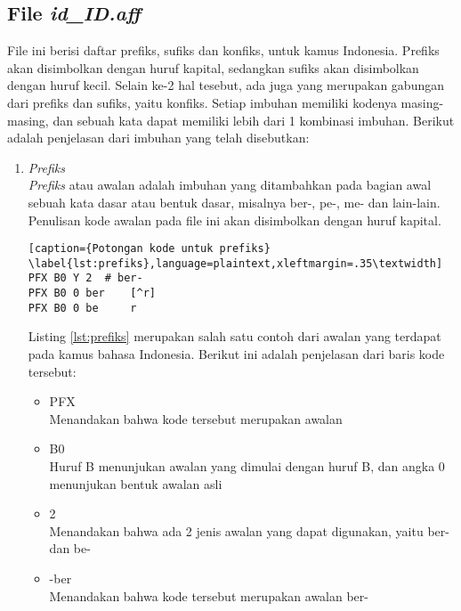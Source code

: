 \subsection{File \textit{id\_ID.aff}}

File ini berisi daftar prefiks, sufiks dan konfiks, untuk kamus Indonesia. Prefiks akan disimbolkan dengan huruf kapital, sedangkan sufiks akan disimbolkan dengan huruf kecil. Selain ke-2 hal tesebut, ada juga yang merupakan gabungan dari prefiks dan sufiks, yaitu konfiks. Setiap imbuhan memiliki kodenya masing-masing, dan sebuah kata dapat memiliki lebih dari 1 kombinasi imbuhan. Berikut adalah penjelasan dari imbuhan yang telah disebutkan:

\begin{enumerate}
	\item \textit{Prefiks} \\
	\textit{Prefiks} atau awalan adalah imbuhan yang ditambahkan pada bagian awal sebuah kata dasar atau bentuk dasar, misalnya ber-, pe-, me- dan lain-lain. Penulisan kode awalan pada file ini akan disimbolkan dengan huruf kapital.
	
	\begin{lstlisting}[caption={Potongan kode untuk prefiks}			\label{lst:prefiks},language=plaintext,xleftmargin=.35\textwidth] 
PFX B0 Y 2	# ber-
PFX B0 0 ber  	[^r]
PFX B0 0 be    	r
	\end{lstlisting}
\medskip
	
	Listing \ref{lst:prefiks} merupakan salah satu contoh dari awalan yang terdapat pada kamus bahasa Indonesia. Berikut ini adalah penjelasan dari baris kode tersebut:	

	\begin{itemize}
		\item PFX\\
		Menandakan bahwa kode tersebut merupakan awalan
		
		\item B0\\
		Huruf B menunjukan awalan yang dimulai dengan huruf B, dan angka 0 menunjukan bentuk awalan asli
		
		\item 2\\
		Menandakan bahwa ada 2 jenis awalan yang dapat digunakan, yaitu ber- dan be-
		\item -ber\\
		Menandakan bahwa kode tersebut merupakan awalan ber-
	\end{itemize}	
		

\end{enumerate}
